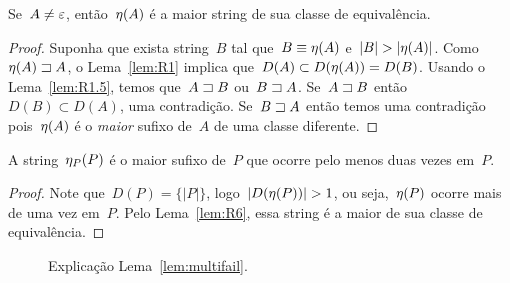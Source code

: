 \begin{lemma}
\label{lem:R6}
Se~$A \neq \varepsilon$, então~$\eta(A)$ é a maior string de sua classe de equivalência.
\end{lemma}

\begin{proof}
Suponha que exista string~$B$ tal que~$B \equiv \eta(A)$ e~$|B| > |\eta(A)|$.
Como~${\eta(A) \sqsupset A}$, o Lema~\ref{lem:R1} implica que~$D(A) \subset D(\eta(A)) = D(B)$. Usando o Lema~\ref{lem:R1.5}, temos que~$A \sqsupset B$ ou~$B \sqsupset A$. Se~$A \sqsupset B$ então~$D(B) \subset D(A)$, uma contradição. Se~$B \sqsupset A$ então temos uma contradição pois~$\eta(A)$ é o \emph{maior} sufixo de~$A$ de uma classe diferente.
\end{proof}

\begin{corollary}
\label{col:falha}
A string~$\eta_P(P)$ é o maior sufixo de~$P$ que ocorre pelo menos duas vezes em~$P$.
\end{corollary}

\begin{proof}
Note que~$D(P) = \{|P|\}$, logo~$|D(\eta(P))| > 1$, ou seja,~$\eta(P)$ ocorre mais de uma vez em~$P$. Pelo Lema~\ref{lem:R6}, essa string é a maior de sua classe de equivalência.
\end{proof}

\begin{figure}
\centering

    \caption{Explicação Lema~\ref{lem:multifail}.}
    \label{fig:faili}
\end{figure}

